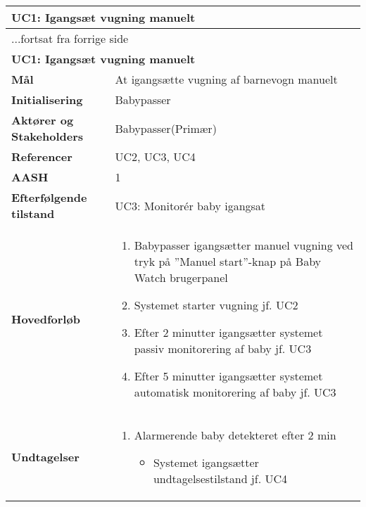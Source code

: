\begin{center} \centering \label{kravspec:uc1}
	\begin{longtable}{|p{5cm}|p{9cm}|}  %
	\hline
		\multicolumn{2}{|l|}{\textbf{UC1: Igangsæt vugning manuelt}} \\\hline %
		\endfirsthead
		
		\multicolumn{2}{l}{...fortsat fra forrige side} \\ \hline %
		\multicolumn{2}{|l|}{\textbf{UC1: Igangsæt vugning manuelt}} \\\hline %
		\endhead	
		
		\textbf{Mål}							&At igangsætte vugning af barnevogn manuelt 		\\\hline
		\textbf{Initialisering}				&Babypasser		\\\hline
		\textbf{Aktører og Stakeholders}		&Babypasser(Primær)		\\\hline 
		\textbf{Referencer}					&UC2, UC3, UC4		\\\hline
		\textbf{AASH}						&1		\\\hline
		\textbf{Efterfølgende tilstand}		&UC3: Monitorér baby igangsat		\\\hline
		\textbf{Hovedforløb}					
			&\begin{enumerate}
	
				\item Babypasser igangsætter manuel vugning ved tryk på ''Manuel start''-knap på Baby Watch brugerpanel
				
				\item \label{kravspec:uc1_vugning}Systemet starter vugning jf. UC2
				
				\item \label{kravspec:uc1_timeout2}Efter 2 minutter igangsætter systemet passiv monitorering af baby jf. UC3			
								
				\item \label{kravspec:uc1_timeout5}Efter 5 minutter igangsætter systemet automatisk monitorering af baby jf. UC3	
				\newline [Und: \ref{kravspec:uc1_timeout5}.a Alarmerende baby detekteret indenfor 5 min]				
				
			\end{enumerate}
		\\\hline
		\textbf{Undtagelser}
			&\begin{enumerate}[label=\ref{kravspec:uc1_timeout5}.a]
			\item Alarmerende baby detekteret efter 2 min
					\begin{itemize}
					
					\item Systemet igangsætter undtagelsestilstand jf. UC4
					
					\end{itemize}
			\end{enumerate}
			
		\\\hline
	\end{longtable} 
\end{center}

